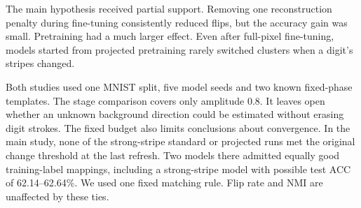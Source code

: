 The main hypothesis received partial support. Removing one reconstruction penalty during fine-tuning consistently reduced flips, but the accuracy gain was small. Pretraining had a much larger effect. Even after full-pixel fine-tuning, models started from projected pretraining rarely switched clusters when a digit's stripes changed.

Both studies used one MNIST split, five model seeds and two known fixed-phase templates. The stage comparison covers only amplitude 0.8. It leaves open whether an unknown background direction could be estimated without erasing digit strokes. The fixed budget also limits conclusions about convergence. In the main study, none of the strong-stripe standard or projected runs met the original change threshold at the last refresh. Two models there admitted equally good training-label mappings, including a strong-stripe model with possible test ACC of 62.14--62.64\%. We used one fixed matching rule. Flip rate and NMI are unaffected by these ties.
